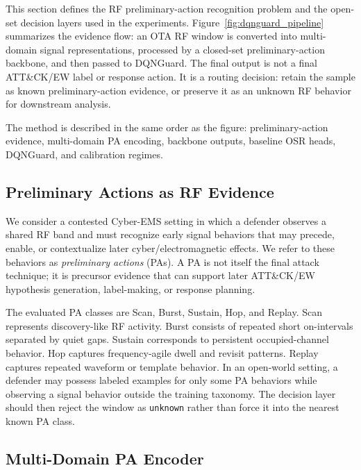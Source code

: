 This section defines the RF preliminary-action recognition problem and the open-set decision layers used in the experiments. Figure~\ref{fig:dqnguard_pipeline} summarizes the evidence flow: an OTA RF window is converted into multi-domain signal representations, processed by a closed-set preliminary-action backbone, and then passed to DQNGuard. The final output is not a final ATT\&CK/EW label or response action. It is a routing decision: retain the sample as known preliminary-action evidence, or preserve it as an unknown RF behavior for downstream analysis.

The method is described in the same order as the figure: preliminary-action evidence, multi-domain PA encoding, backbone outputs, baseline OSR heads, DQNGuard, and calibration regimes.

\subsection{Preliminary Actions as RF Evidence}
\label{subsec:pa_precursors}

We consider a contested Cyber-EMS setting in which a defender observes a shared RF band and must recognize early signal behaviors that may precede, enable, or contextualize later cyber/electromagnetic effects. We refer to these behaviors as \emph{preliminary actions} (PAs). A PA is not itself the final attack technique; it is precursor evidence that can support later ATT\&CK/EW hypothesis generation, label-making, or response planning.

The evaluated PA classes are Scan, Burst, Sustain, Hop, and Replay. Scan represents discovery-like RF activity. Burst consists of repeated short on-intervals separated by quiet gaps. Sustain corresponds to persistent occupied-channel behavior. Hop captures frequency-agile dwell and revisit patterns. Replay captures repeated waveform or template behavior. In an open-world setting, a defender may possess labeled examples for only some PA behaviors while observing a signal behavior outside the training taxonomy. The decision layer should then reject the window as \texttt{unknown} rather than force it into the nearest known PA class.

\subsection{Multi-Domain PA Encoder}
\label{subsec:pa_encoder}

